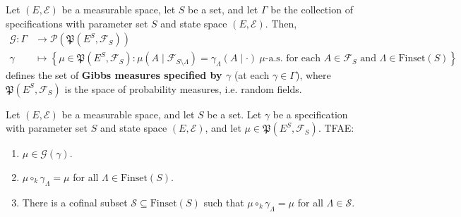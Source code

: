 \begin{definition}
    \label{def:gibbsMeasures}
    
    Let $(E,\mathcal{E})$ be a measurable space, let $S$ be a set, and let $\Gamma$ be the collection of specifications with parameter set $S$ and state space $(E,\mathcal{E})$. Then,
    \begin{align*}
        \mathcal{G}:\Gamma&\to\mathcal{P}(\mathfrak{P}(E^S,\mathcal{F}_S))\\
        \gamma&\mapsto\left\{\mu\in\mathfrak{P}(E^S,\mathcal{F}_S):\mu(A\mid\mathcal{F}_{S\setminus\Lambda})=\gamma_\Lambda(A\mid\cdot)~\mu\text{-a.s. for each } A\in\mathcal{F}_S\text{ and }\Lambda\in\text{Finset}(S)\right\}
    \end{align*}
    defines the set of \textbf{Gibbs measures specified by $\gamma$} (at each $\gamma\in\Gamma$), where $\mathfrak{P}(E^S,\mathcal{F}_S)$ is the space of probability measures, i.e. random fields.
    
\end{definition}

\begin{lemma}
    \label{lem:charGibbsMeasures}
    
    \leanok
    Let $(E,\mathcal{E})$ be a measurable space, and let $S$ be a set. Let $\gamma$ be a specification with parameter set $S$ and state space $(E,\mathcal{E})$, and let $\mu\in\mathfrak{P}(E^S,\mathcal{F}_S)$. TFAE:
    \begin{enumerate}
        \item $\mu\in\mathcal{G}(\gamma)$.
        \item $\mu\circ_k\gamma_\Lambda=\mu$ for all $\Lambda\in\text{Finset}(S)$.
        \item There is a cofinal subset $\mathcal{S}\subseteq\text{Finset}(S)$ such that $\mu\circ_k\gamma_\Lambda=\mu$ for all $\Lambda\in\mathcal{S}$.
    \end{enumerate}
\end{lemma}

